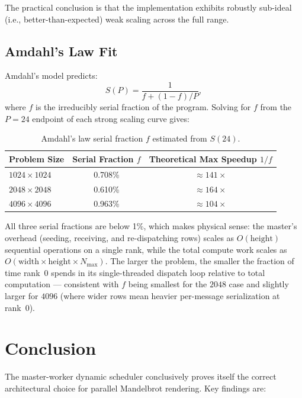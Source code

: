 \documentclass[11pt]{article}
\begin{document}
The practical conclusion is that the implementation exhibits robustly
sub-ideal (i.e., better-than-expected) weak scaling across the full range.

\subsection{Amdahl's Law Fit}

Amdahl's model predicts:
\[
  S(P) = \frac{1}{f + (1-f)/P},
\]
where $f$ is the irreducibly serial fraction of the program. Solving for $f$
from the $P = 24$ endpoint of each strong scaling curve gives:

\begin{table}[H]
  \centering
  \caption{Amdahl's law serial fraction $f$ estimated from $S(24)$.}
  \label{tab:amdahl}
  \begin{tabular}{lcc}
    \toprule
    \textbf{Problem Size} & \textbf{Serial Fraction $f$} & \textbf{Theoretical Max Speedup $1/f$} \\
    \midrule
    $1024 \times 1024$ & 0.708\% & $\approx 141\times$ \\
    $2048 \times 2048$ & 0.610\% & $\approx 164\times$ \\
    $4096 \times 4096$ & 0.963\% & $\approx 104\times$ \\
    \bottomrule
  \end{tabular}
\end{table}

All three serial fractions are below 1\%, which makes physical sense: the
master's overhead (seeding, receiving, and re-dispatching rows) scales as
$O(\text{height})$ sequential operations on a single rank, while the total
compute work scales as $O(\text{width} \times \text{height} \times N_{\max})$.
The larger the problem, the smaller the fraction of time rank~0 spends in its
single-threaded dispatch loop relative to total computation — consistent with
$f$ being smallest for the $2048$ case and slightly larger for $4096$ (where
wider rows mean heavier per-message serialization at rank~0).

\section{Conclusion}

The master-worker dynamic scheduler conclusively proves itself the correct
architectural choice for parallel Mandelbrot rendering. Key findings are:
\end{document}
